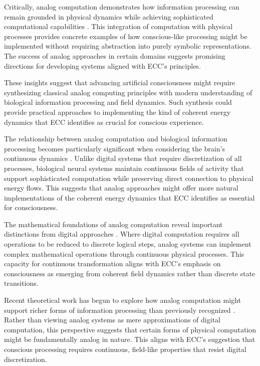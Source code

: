 Critically, analog computation demonstrates how information processing can remain grounded in physical dynamics while achieving sophisticated computational capabilities \cite{PourEl2017}. This integration of computation with physical processes provides concrete examples of how conscious-like processing might be implemented without requiring abstraction into purely symbolic representations. The success of analog approaches in certain domains suggests promising directions for developing systems aligned with ECC's principles.

These insights suggest that advancing artificial consciousness might require synthesizing classical analog computing principles with modern understanding of biological information processing and field dynamics. Such synthesis could provide practical approaches to implementing the kind of coherent energy dynamics that ECC identifies as crucial for conscious experience.

The relationship between analog computation and biological information processing becomes particularly significant when considering the brain's continuous dynamics \cite{Ashby1960}. Unlike digital systems that require discretization of all processes, biological neural systems maintain continuous fields of activity that support sophisticated computation while preserving direct connection to physical energy flows. This suggests that analog approaches might offer more natural implementations of the coherent energy dynamics that ECC identifies as essential for consciousness.

The mathematical foundations of analog computation reveal important distinctions from digital approaches \cite{BialynickiBirula1976}. Where digital computation requires all operations to be reduced to discrete logical steps, analog systems can implement complex mathematical operations through continuous physical processes. This capacity for continuous transformation aligns with ECC's emphasis on consciousness as emerging from coherent field dynamics rather than discrete state transitions.

Recent theoretical work has begun to explore how analog computation might support richer forms of information processing than previously recognized \cite{Cowan2017}. Rather than viewing analog systems as mere approximations of digital computation, this perspective suggests that certain forms of physical computation might be fundamentally analog in nature. This aligns with ECC's suggestion that conscious processing requires continuous, field-like properties that resist digital discretization.

